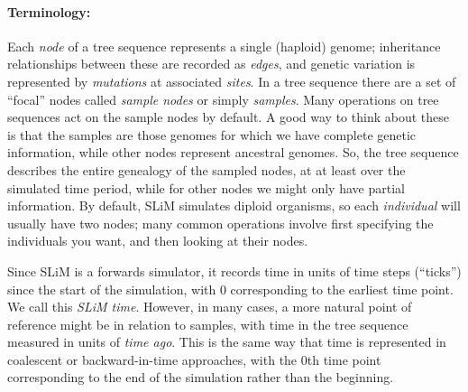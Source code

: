 \documentclass[12pt]{article}
\begin{document}
\paragraph{Terminology:}
Each \textit{node} of a tree sequence represents a single (haploid) genome;
inheritance relationships between these are recorded as \textit{edges},
and genetic variation is represented by \textit{mutations} at associated \textit{sites}.
In a tree sequence there are a set of ``focal'' nodes called \textit{sample nodes} or simply \textit{samples}.
Many operations on tree sequences act on the sample nodes by default.
A good way to think about these is that the samples are those genomes
for which we have complete genetic information, while other nodes represent ancestral genomes.
So, the tree sequence describes the entire genealogy of the sampled nodes,
at at least over the simulated time period,
while for other nodes we might only have partial information.
By default, SLiM simulates diploid organisms, so each \textit{individual} will usually have two nodes;
many common operations involve first specifying the individuals you want,
and then looking at their nodes.

Since SLiM is a forwards simulator, it records time in units of time steps (``ticks'')
since the start of the simulation, with 0 corresponding to the earliest time point.
We call this \textit{SLiM time}.
However, in many cases, a more natural point of reference might be in relation to samples, with
time in the tree sequence measured in units of \textit{time ago}. This is the same way that time
is represented in coalescent or backward-in-time approaches, with the 0th time point corresponding
to the end of the simulation rather than the beginning.
\end{document}
